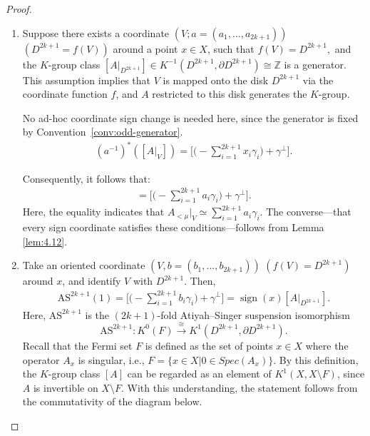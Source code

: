 \documentclass{amsart}
\theoremstyle{definition}
\theoremstyle{remark}
\begin{document}
\begin{proof}
\begin{enumerate}
\item Suppose there exists a coordinate $(V;a=(a_1,...,a_{2k+1}))$ $(D^{2k+1}=f(V))$ around a point $x\in X$, such that $f(V)=D^{2k+1},$ and the $K$-group class
$[A|_{D^{2k+1}}] \in K^{-1}( D^{2k+1},\partial D^{2k+1})\cong \mathbb{Z}$ is a generator. This assumption implies that $V$ is mapped onto the disk $D^{2k+1}$ via the coordinate function $f$, and $A$ restricted to this disk generates the $K$-group.

\noindent
No ad-hoc coordinate sign change is needed here, since the generator is fixed by Convention~\ref{conv:odd-generator}.
\begin{align*}
(a^{-1})^*([A|_V])=
\Big[\Big(-\sum_{i=1}^{2k+1}x_i\gamma_i\Big)+\gamma^\perp\Big].
\end{align*}

Consequently, it follows that:
\begin{align*}
[A|_V]=
\Big[\Big(-\sum_{i=1}^{2k+1}a_i\gamma_i\Big)+\gamma^\perp\Big].
\end{align*}
Here, the equality indicates that $A_{<\mu}|_{V}\simeq \sum_{i=1}^{2k+1}a_i\gamma_i$.
The converse—that every sign coordinate satisfies these conditions—follows from Lemma \ref{lem:4.12}.

\item Take an oriented coordinate $(V,b=(b_{1},...,b_{2k+1}))$ $(f(V)=D^{2k+1})$ around $x$, and identify $V$ with $D^{2k+1}$. Then,
\begin{align*}
\mathrm{AS}^{2k+1}(1)=\Big[\Big(-\sum_{i=1}^{2k+1}b_i\gamma_i\Big) + \gamma^{\perp}\Big]
=\operatorname{sign}(x)[A|_{D^{2k+1}}].
\end{align*}
Here, $\mathrm{AS}^{2k+1}$ is the $(2k+1)$-fold Atiyah--Singer suspension isomorphism
\[
\mathrm{AS}^{2k+1}\colon K^{0}(F)\xrightarrow{\cong}K^{1}(D^{2k+1},\partial D^{2k+1}).
\]
Recall that the Fermi set $F$ is defined as the set of points $x\in X$ where the operator $A_x$ is singular, i.e., $F=\{x\in X|0\in Spec(A_x)\}.$ By this definition, the $K$-group class $[A]$ can be regarded as an element of $K^{1}(X, X\setminus F)$, since $A$ is invertible on $X\setminus F$. With this understanding, the statement follows from the commutativity of the diagram below.

\end{enumerate}
\end{proof}
\end{document}
